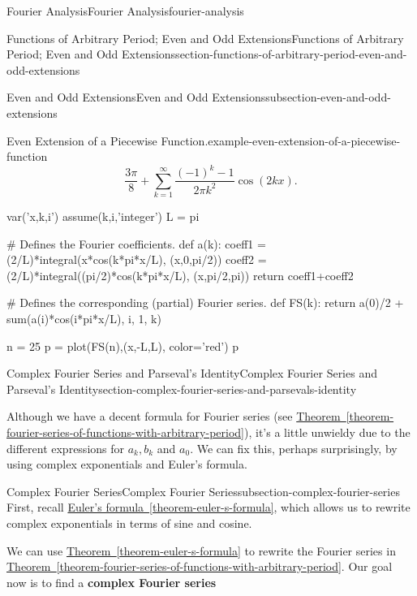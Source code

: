 \documentclass[oneside,10pt,]{book}
\newcommand{\terminology}[1]{\textbf{#1}}
\numberwithin{equation}{section}
\begin{document}
\begin{chapterptx}{Fourier Analysis}{}{Fourier Analysis}{}{}{fourier-analysis}
\begin{sectionptx}{Functions of Arbitrary Period; Even and Odd Extensions}{}{Functions of Arbitrary Period; Even and Odd Extensions}{}{}{section-functions-of-arbitrary-period-even-and-odd-extensions}
\begin{subsectionptx}{Even and Odd Extensions}{}{Even and Odd Extensions}{}{}{subsection-even-and-odd-extensions}
\begin{example}{Even Extension of a Piecewise Function.}{example-even-extension-of-a-piecewise-function}
\begin{equation*}
\frac{3\pi}{8}+\sum_{k=1}^{\infty}\frac{(-1)^{k}-1}{2\pi k^{2}}\cos(2kx).
\end{equation*}
%
\end{example}
\begin{sageinput}
var('x,k,i')
assume(k,i,'integer')
L = pi

# Defines the Fourier coefficients.
def a(k):
  coeff1 = (2/L)*integral(x*cos(k*pi*x/L), (x,0,pi/2))
  coeff2 = (2/L)*integral((pi/2)*cos(k*pi*x/L), (x,pi/2,pi))
  return coeff1+coeff2

# Defines the corresponding (partial) Fourier series.
def FS(k):
  return a(0)/2 + sum(a(i)*cos(i*pi*x/L), i, 1, k)

n = 25
p = plot(FS(n),(x,-L,L), color='red')
p
\end{sageinput}
\end{subsectionptx}
\end{sectionptx}
%
%
\typeout{************************************************}
\typeout{************************************************}
%
\begin{sectionptx}{Complex Fourier Series and Parseval's Identity}{}{Complex Fourier Series and Parseval's Identity}{}{}{section-complex-fourier-series-and-parsevals-identity}
\begin{introduction}{}%
\hypertarget{p-600}{}%
Although we have a decent formula for Fourier series (see \hyperref[theorem-fourier-series-of-functions-with-arbitrary-period]{Theorem~\ref{theorem-fourier-series-of-functions-with-arbitrary-period}}), it's a little unwieldy due to the different expressions for \(a_{k},b_{k}\) and \(a_{0}\). We can fix this, perhaps surprisingly, by using complex exponentials and Euler's formula.%
\end{introduction}%
%
%
\typeout{************************************************}
\typeout{************************************************}
%
\begin{subsectionptx}{Complex Fourier Series}{}{Complex Fourier Series}{}{}{subsection-complex-fourier-series}
\hypertarget{p-601}{}%
First, recall \hyperref[theorem-euler-s-formula]{Euler's formula~\ref{theorem-euler-s-formula}}, which allows us to rewrite complex exponentials in terms of sine and cosine.%
\par
\hypertarget{p-602}{}%
We can use \hyperref[theorem-euler-s-formula]{Theorem~\ref{theorem-euler-s-formula}} to rewrite the Fourier series in \hyperref[theorem-fourier-series-of-functions-with-arbitrary-period]{Theorem~\ref{theorem-fourier-series-of-functions-with-arbitrary-period}}. Our goal now is to find a \terminology{complex Fourier series}%

\end{subsectionptx}
\end{sectionptx}
\end{chapterptx}
\end{document}

